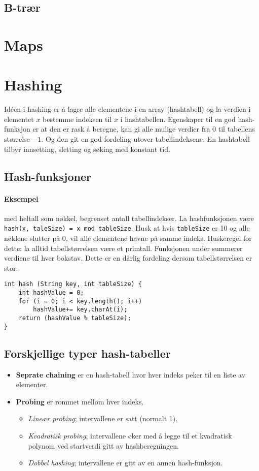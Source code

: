 \documentclass[11pt,a4paper]{article}
\begin{document}
\subsection{B-trær}

\section{Maps}

\section{Hashing}
Idéen i hashing er å lagre alle elementene i en array (hashtabell) og la verdien i elementet $x$ bestemme indeksen til $x$ i hashtabellen. Egenskaper til en god hash-funksjon er at den er rask å beregne, kan gi alle mulige verdier fra 0 til tabellens størrelse $-1$. Og den git en god fordeling utover tabellindeksene. En hashtabell tilbyr innsetting, sletting og søking med konstant tid.

\subsection{Hash-funksjoner}
\paragraph{Eksempel} med heltall som nøkkel, begrenset antall tabellindekser. La hashfunksjonen være \texttt{hash(x, taleSize) = x mod tableSize}. Husk at hvis \texttt{tableSize} er 10 og alle nøklene slutter på 0, vil alle elementene havne på samme indeks. Huskeregel for dette: la alltid tabellstørrelsen være et primtall. Funksjonen under summerer verdiene til hver bokstav. Dette er en dårlig fordeling dersom tabellstørrelsen er stor.
\begin{lstlisting}
int hash (String key, int tableSize) {
	int hashValue = 0;
	for (i = 0; i < key.length(); i++) 
		hashValue+= key.charAt(i);
	return (hashValue % tableSize);
}
\end{lstlisting}

\subsection{Forskjellige typer hash-tabeller}
\begin{itemize}
\item
\textbf{Seprate chaining} er en hash-tabell hvor hver indeks peker til en liste av elementer.
\item
\textbf{Probing} er rommet mellom hver indeks.
\begin{itemize}
\item
\textit{Lineær probing}; intervallene er satt (normalt 1).
\item
\textit{Kvadratisk probing}; intervallene øker med å legge til et kvadratisk polynom ved startverdi gitt av hashberegningen.
\item
\textit{Dobbel hashing}; intervallene er gitt av en annen hash-funksjon.
\end{itemize}
\end{itemize}
\end{document}
